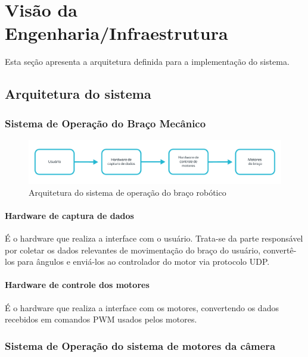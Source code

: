 	\section{Visão da Engenharia/Infraestrutura}\label{sec-eng}
	Esta seção apresenta a arquitetura definida para a implementação do sistema.
	\subsection{Arquitetura do sistema}\label{subsec-arq}	
	\subsubsection{Sistema de Operação do Braço Mecânico}\label{subsec-arq-arm}

	\begin{figure}[h!]
		\caption{\label{fig_arq-arm}  Arquitetura do sistema de operação do braço robótico}
		\begin{center}
			\includegraphics[width=\textwidth]{arq-arm.pdf}	
		\end{center}
	\end{figure}
	
	\paragraph{Hardware de captura de dados}\label{par-arq-armcapture}
	É o hardware que realiza a interface com o usuário.
	Trata-se da parte responsável por coletar os dados relevantes de movimentação do braço do usuário, convertê-los para ângulos e enviá-los ao controlador do motor via protocolo UDP.\par

		\paragraph{Hardware de controle dos motores}\label{par-arq-armtranslate}
	É o hardware que realiza a interface com os motores, convertendo os dados recebidos em comandos PWM usados pelos motores.\par

	\subsubsection{Sistema de Operação do sistema de motores da câmera}\label{subsec-arq-mot}	

